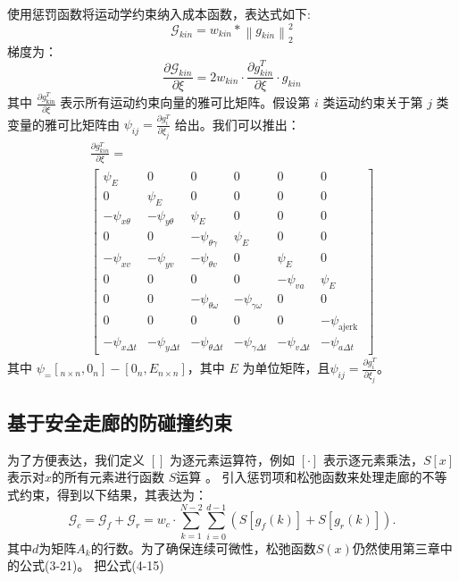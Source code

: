\documentclass[master,academic]{ysuthesis} %
\begin{document}
		使用惩罚函数将运动学约束纳入成本函数，表达式如下:
		\begin{equation}
			\mathcal{G}_{kin} = w_{kin}*\left \| g_{kin} \right \|_2^2
		\end{equation}
		梯度为：
		\begin{equation}
			\frac{\partial\mathcal{G}_{kin}}{\partial\xi}=2w_{kin}\cdot\frac{\partial g_{kin}^T}{\partial\xi}\cdot g_{kin}\label{18}
		\end{equation}
		其中 \(\frac{\partial g_{\text{kin}}^T}{\partial \xi}\) 表示所有运动约束向量的雅可比矩阵。假设第 \(i\) 类运动约束关于第 \(j\) 类变量的雅可比矩阵由 \(\psi_{ij} = \frac{\partial g^T_{i}}{\partial \xi_j}\) 给出。我们可以推出：
		\begin{equation}
			\begin{array}{c}
				\frac{\partial g_{k i n}^{T}}{\partial \xi}= \\
				{\left[\begin{array}{cccccc}
						\psi_{E} & 0 & 0 & 0 & 0 & 0 \\
						0 & \psi_{E} & 0 & 0 & 0 & 0 \\
						-\psi_{x \theta} & -\psi_{y \theta} & \psi_{E} & 0 & 0 & 0 \\
						0 & 0 & -\psi_{\theta \gamma} & \psi_{E} & 0 & 0 \\
						-\psi_{x v} & -\psi_{y v} & -\psi_{\theta v} & 0 & \psi_{E} & 0 \\
						0 & 0 & 0 & 0 & -\psi_{v a} & \psi_{E} \\
						0 & 0 & -\psi_{\theta \omega} & -\psi_{\gamma \omega} & 0 & 0 \\
						0 & 0 & 0 & 0 & 0 & -\psi_{\text {ajerk }} \\
						-\psi_{x \Delta t} & -\psi_{y \Delta t} & -\psi_{\theta \Delta t} & -\psi_{\gamma \Delta t} & -\psi_{v \Delta t} & -\psi_{a \Delta t}
					\end{array}\right]}
			\end{array}
		\end{equation}
		其中 $\psi _ = [_{n \times n}, 0_n] - [0_n, E_{n \times n}]$，其中 $E$ 为单位矩阵，且\(\psi_{ij} = \frac{\partial g^T_{i}}{\partial \xi_j}\)。
		\subsection{基于安全走廊的防碰撞约束}
		为了方便表达，我们定义 \([]\) 为逐元素运算符，例如 \([\cdot]\) 表示逐元素乘法，\(S[x]\) 表示对$x$的所有元素进行函数 \(S\)运算 。
		引入惩罚项和松弛函数来处理走廊的不等式约束，得到以下结果，其表达为：
		\begin{equation}
			\mathcal{G}_c =\mathcal{G}_{f}+\mathcal{G}_{r}=w_{c}\cdot \sum_{k=1}^{N-2}\sum_{i=0}^{d-1}(S[g_f(k)] + S[g_r(k)]).\label{20}
		\end{equation}
			其中$d$为矩阵$A_k$的行数。为了确保连续可微性，松弛函数$S(x)$仍然使用第三章中的公式(3-21)。
			把公式(4-15)
		
\end{document}

